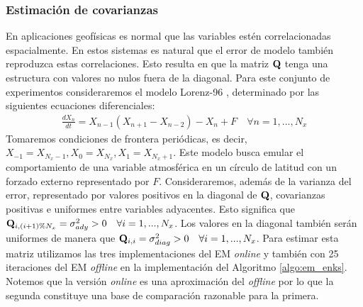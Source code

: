 \subsubsection{Estimación de covarianzas}
En aplicaciones geofísicas es normal que las variables estén correlacionadas espacialmente. En estos sistemas es natural que el error de modelo también reproduzca estas correlaciones. Esto resulta en que la matriz $\mathbf{Q}$ tenga una estructura con valores no nulos fuera de la diagonal. Para este conjunto de experimentos consideraremos el modelo Lorenz-96 \citep{Lorenz1996}, determinado por las siguientes ecuaciones diferenciales:
\begin{align}
    \frac{d X_n}{d t} = X_{n-1}(X_{n+1} - X_{n-2}) - X_n + F \hspace{1em} \forall n = 1, ..., N_x 
\end{align}
Tomaremos condiciones de frontera periódicas, es decir, $X_{-1} = X_{N_x-1}, X_0 = X_{N_x}, X_1 = X_{N_x+1}$. Este modelo busca emular el comportamiento de una variable atmosférica en un círculo de latitud con un forzado externo representado por $F$. Consideraremos, además de la varianza del error, representado por valores positivos en la diagonal de $\mathbf{Q}$, covarianzas positivas e uniformes entre variables adyacentes. Esto significa que $\mathbf{Q}_{i, (i+1)\%N_x} = \sigma_{ady}^2 > 0 \hspace{1em} \forall i = 1, ..., N_x$. Los valores en la diagonal también serán uniformes de manera que $\mathbf{Q}_{i, i} = \sigma_{diag}^2 > 0 \hspace{1em} \forall i = 1, ..., N_x$. Para estimar esta matriz utilizamos las tres implementaciones del EM \textit{online} y también con 25 iteraciones del EM \textit{offline} en la implementación del Algoritmo \ref{algo:em_enks}. Notemos que la versión \textit{online} es una aproximación del \textit{offline} por lo que la segunda constituye una base de comparación razonable para la primera.

